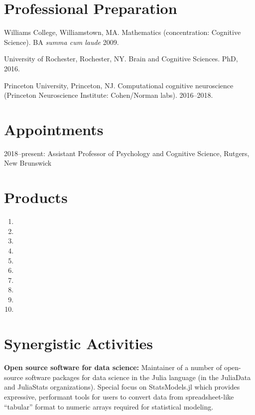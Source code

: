 \documentclass[11pt]{article}
\begin{document}
\section{Professional Preparation}

Williams College, Williamstown, MA. Mathematics (concentration: Cognitive
Science).  BA \emph{summa cum laude} 2009.

University of Rochester, Rochester, NY. Brain and Cognitive Sciences. PhD, 2016.

Princeton University, Princeton, NJ. Computational cognitive neuroscience
(Princeton Neuroscience Institute: Cohen/Norman labs). 2016--2018.


\section{Appointments}

2018--present: Assistant Professor of Psychology and Cognitive Science,
  Rutgers, New Brunswick

\section{Products}

\begin{enumerate}
  \item {}
  \item {}
  \item {}
  \item {}
  \item {}
  \item {}
  \item {}
  \item {}
  \item {}
  \item {}
\end{enumerate}  

\section{Synergistic Activities}

\textbf{Open source software for data science:} Maintainer of a number of
open-source software packages for data science in the Julia language (in the
JuliaData and JuliaStats organizations).  Special focus on StatsModels.jl which
provides expressive, performant tools for users to convert data from
spreadsheet-like ``tabular'' format to numeric arrays required for statistical
modeling.
\end{document}
